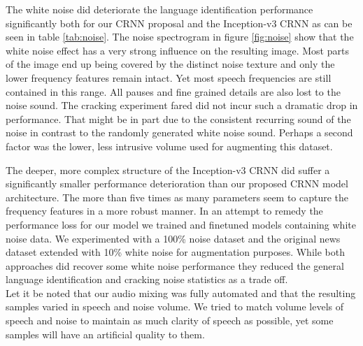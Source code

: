 The white noise did deteriorate the language identification performance significantly both for our CRNN proposal and the Inception-v3 CRNN as can be seen in table \ref{tab:noise}. The noise spectrogram in figure \ref{fig:noise} show that the white noise effect has a very strong influence on the resulting image. Most parts of the image end up being covered by the distinct noise texture and only the lower frequency features remain intact. Yet most speech frequencies are still contained in this range. All pauses and fine grained details are also lost to the noise sound. The cracking experiment fared did not incur such a dramatic drop in performance. That might be in part due to the consistent recurring sound of the noise in contrast to the randomly generated white noise sound. Perhaps a second factor was the lower, less intrusive volume used for augmenting this dataset.

The deeper, more complex structure of the Inception-v3 CRNN did suffer a significantly smaller performance deterioration than our proposed CRNN model architecture. The more than five times as many parameters seem to capture the frequency features in a more robust manner. In an attempt to remedy the performance loss for our model we trained and finetuned models containing white noise data. We experimented with a 100\% noise dataset and the original news dataset extended with 10\% white noise for augmentation purposes. While both approaches did recover some white noise performance they reduced the general language identification and cracking noise statistics as a trade off.\\
Let it be noted that our audio mixing was fully automated and that the resulting samples varied in speech and noise volume. We tried to match volume levels of speech and noise to maintain as much clarity of speech as possible, yet some samples will have an artificial quality to them.


